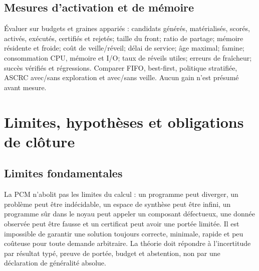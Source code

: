 \documentclass[11pt,a4paper,openany]{book}
\theoremstyle{definition}
\theoremstyle{plain}
\theoremstyle{remark}
\begin{document}
\section{Mesures d'activation et de mémoire}
Évaluer sur budgets et graines appariés : candidats générés, matérialisés, scorés, activés, exécutés, certifiés et rejetés; taille du front; ratio de partage; mémoire résidente et froide; coût de veille/réveil; délai de service; âge maximal; famine; consommation CPU, mémoire et I/O; taux de réveils utiles; erreurs de fraîcheur; succès vérifiés et régressions. Comparer FIFO, best-first, politique stratifiée, ASCRC avec/sans exploration et avec/sans veille. Aucun gain n'est présumé avant mesure.

\chapter{Limites, hypothèses et obligations de clôture}
\section{Limites fondamentales}
La PCM n'abolit pas les limites du calcul : un programme peut diverger, un problème peut être indécidable, un espace de synthèse peut être infini, un programme sûr dans le noyau peut appeler un composant défectueux, une donnée observée peut être fausse et un certificat peut avoir une portée limitée. Il est impossible de garantir une solution toujours correcte, minimale, rapide et peu coûteuse pour toute demande arbitraire. La théorie doit répondre à l'incertitude par résultat typé, preuve de portée, budget et abstention, non par une déclaration de généralité absolue.
\end{document}
